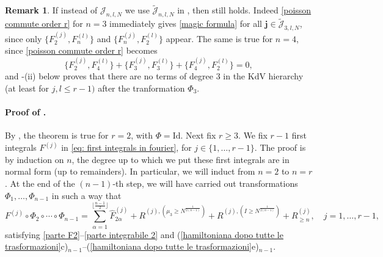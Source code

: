 \documentclass[a4paper,10pt,reqno]{article}
\theoremstyle{definition}
\theoremstyle{plain}
\theoremstyle{plain}
\theoremstyle{definition}
\theoremstyle{plain}
\theoremstyle{plain}
\theoremstyle{plain}
\theoremstyle{definition}
\newtheorem{rem}[definition]{Remark}
\theoremstyle{definition}
\def \J{\mathcal{J}}
\def \j{\bm{j}}
\begin{document}
\begin{rem} \label{blabla}
If instead of $\mathcal{J}_{n,l,N}$ we use $\widetilde{\mathcal{J}}_{n,l,N}$ in , then  still holds.
Indeed \eqref{poisson commute order r} for $n=3$ immediately gives \eqref{magic formula} for all $\j \in \widetilde{\J}_{3,l,N}$, since only $\{F_2^{(j)},F_n^{(l)}\}$ and $\{F_n^{(j)},F_2^{(l)}\}$ appear.
The same is true for $n=4$, since \eqref{poisson commute order r} becomes 
\[
\{ F_2^{(j)}, F_{4}^{(l)} \} + \{ F_3^{(j)}, F_{3}^{(l)} \} + \{ F_{4}^{(j)}, F_2^{(l)} \} = 0,
\]
and -(ii) below proves that there are no terms of degree 3 in the KdV hierarchy (at least for $j,l \le r-1)$ after the tranformation $\Phi_3$.
\end{rem}

\paragraph{Proof of .}
By , the theorem is true for $r=2$, with $\Phi = \mbox{Id}$.
Next fix $r\geq 3$. We fix $r-1$ first integrals $F^{(j)}$ in \eqref{eq: first integrals in fourier}, for $j \in \{ 1, \ldots , r-1 \}$.
The proof is by induction on $n$, the degree up to which we put these first integrals are in normal form (up to remainders). In particular, we will induct from $n=2$ to $n=r$.
At the end of the $(n-1)$-th step, we will have carried out transformations $\Phi_1,\ldots,\Phi_{n-1}$ in such a way that
\begin{equation}\label{pre induction}
F^{(j)} \circ \Phi_2\circ\cdots\circ \Phi_{n-1}= \sum_{\alpha = 1}^{\lfloor \frac{n-1}{2} \rfloor } \widehat{F}_{2\alpha}^{(j)} + R^{(j),(\mu_3 \ge N^{\frac{1}{2(n-1)}})} + R^{(j),(I \ge N^{\frac{1}{2(n-1)}})} + R_{\ge n}^{(j)} ,\quad j=1,\ldots, r-1,
\end{equation}
satisfying \ref{parte F2}--\ref{parte integrabile 2} and (\ref{hamiltoniana dopo tutte le trasformazioni}c)$_{n-1}$--(\ref{hamiltoniana dopo tutte le trasformazioni}e)$_{n-1}$. 

\medskip 
\end{document}
